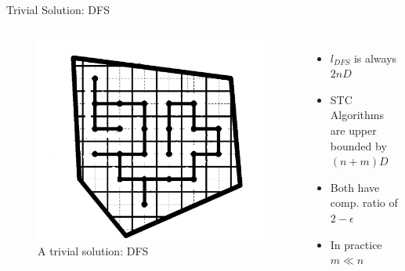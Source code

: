 \documentclass{beamer}
\begin{document}
\begin{frame}{Trivial Solution: DFS}
    \begin{columns}
        \begin{figure}
            \includegraphics[width=0.8\linewidth]{Images/DFS.png}
            \caption{A trivial solution: DFS}
        \end{figure}
        \begin{itemize}
            \item $l_{DFS}$ is always $2nD$
            \item STC Algorithms are upper bounded by $(n + m) D$
            \item Both have comp. ratio of $2 - \epsilon$
            \item In practice $m \ll n$
        \end{itemize}
    \end{columns}
\end{frame}



\end{document}
